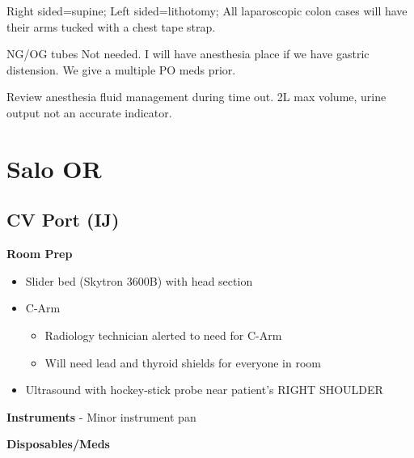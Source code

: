 \documentclass[
]{book}
\providecommand{\tightlist}{%
  \setlength{\itemsep}{0pt}\setlength{\parskip}{0pt}}
\begin{document}
Right sided=supine; Left sided=lithotomy; All laparoscopic colon cases will have their arms tucked with a chest tape strap.

NG/OG tubes Not needed. I will have anesthesia place if we have gastric distension. We give a multiple PO meds prior.

Review anesthesia fluid management during time out. 2L max volume, urine output not an accurate indicator.

\hypertarget{part-salo-or}{%
\part*{Salo OR}\label{part-salo-or}}

\hypertarget{cv_port_salo}{%
\chapter{CV Port (IJ)}\label{cv_port_salo}}

\textbf{Room Prep}

\begin{itemize}
\tightlist
\item
  Slider bed (Skytron 3600B) with head section
\item
  C-Arm

  \begin{itemize}
  \tightlist
  \item
    Radiology technician alerted to need for C-Arm
  \item
    Will need lead and thyroid shields for everyone in room
  \end{itemize}
\item
  Ultrasound with hockey-stick probe near patient's RIGHT SHOULDER
\end{itemize}

\textbf{Instruments}
- Minor instrument pan

\textbf{Disposables/Meds}
\end{document}
